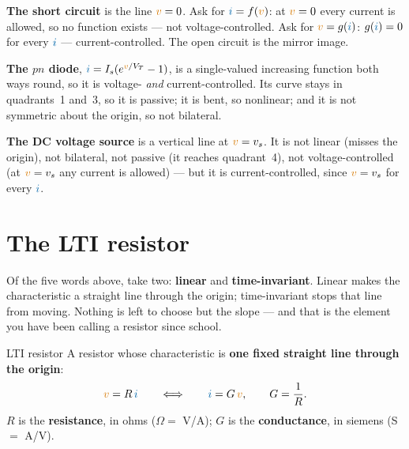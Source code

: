 \documentclass[11pt,a4paper]{article}
\newcommand{\Icol}[1]{\textcolor{ccur}{#1}}
\newcommand{\Vcol}[1]{\textcolor{cvolt}{#1}}
\begin{document}
\begin{examplebox}
\textbf{The short circuit} is the line $\Vcol{v} = 0$. Ask for $\Icol{i} = f(\Vcol{v})$:
at $\Vcol{v} = 0$ every current is allowed, so no function exists --- not
voltage-controlled. Ask for $\Vcol{v} = g(\Icol{i})$: $g(\Icol{i}) = 0$ for every
$\Icol{i}$ --- current-controlled. The open circuit is the mirror image.
\vspace{3pt}

\textbf{The $pn$ diode}, $\Icol{i} = I_s(e^{\Vcol{v}/V_T} - 1)$, is a single-valued
increasing function both ways round, so it is voltage- \emph{and} current-controlled. Its
curve stays in quadrants~1 and~3, so it is passive; it is bent, so nonlinear; and it is
not symmetric about the origin, so not bilateral.
\vspace{3pt}

\textbf{The DC voltage source} is a vertical line at $\Vcol{v} = v_s$. It is not linear
(misses the origin), not bilateral, not passive (it reaches quadrant~4), not
voltage-controlled (at $\Vcol{v} = v_s$ any current is allowed) --- but it is
current-controlled, since $\Vcol{v} = v_s$ for every $\Icol{i}$.
\end{examplebox}

\section{The LTI resistor}

Of the five words above, take two: \textbf{linear} and \textbf{time-invariant}. Linear
makes the characteristic a straight line through the origin; time-invariant stops that
line from moving. Nothing is left to choose but the slope --- and that is the element you
have been calling a resistor since school.

\begin{definitionbox}{LTI resistor}
A resistor whose characteristic is \textbf{one fixed straight line through the origin}:
\[
  \Vcol{v} = R\,\Icol{i}
  \qquad\Longleftrightarrow\qquad
  \Icol{i} = G\,\Vcol{v} ,
  \qquad G = \frac{1}{R} .
\]
$R$ is the \textbf{resistance}, in ohms ($\Omega = $ V/A); $G$ is the
\textbf{conductance}, in siemens (S $=$ A/V).
\end{definitionbox}
\end{document}
